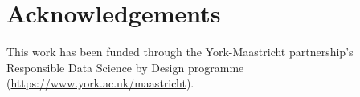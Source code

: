 \documentclass[sigconf,review]{acmart}
\begin{document}
\section{Acknowledgements}
\label{sec:acknowledgements}
This work has been funded through the York-Maastricht
partnership’s Responsible Data Science by Design programme
(\url{https://www.york.ac.uk/maastricht}).

%
%

 

\end{document}
